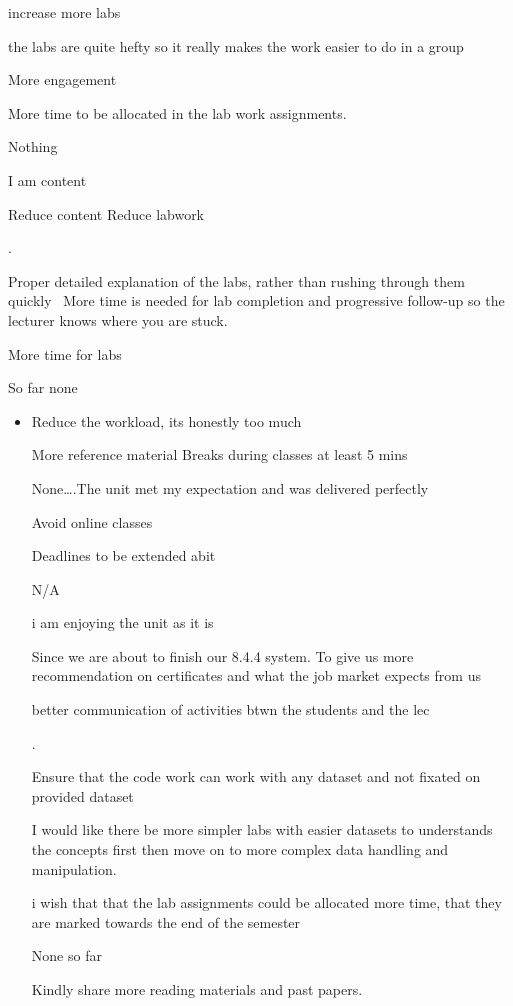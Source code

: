 \documentclass[
]{article}
\begin{document}
\begin{enumerate}
\begin{itemize}
    increase more labs

    the labs are quite hefty so it really makes the work easier to do in
    a group

    More engagement

    More time to be allocated in the lab work assignments.

    Nothing

    I am content

    Reduce content Reduce labwork

    .

    Proper detailed explanation of the labs, rather than rushing through
    them quickly~ More time is needed for lab completion and progressive
    follow-up so the lecturer knows where you are stuck.

    More time for labs

    So far none

    \begin{itemize}
    \item
      Reduce the workload, its honestly too much

      More reference material Breaks during classes at least 5 mins ~

      None\ldots.The unit met my expectation and was delivered perfectly

      Avoid online classes

      Deadlines to be extended abit

      N/A

      i am enjoying the unit as it is

      Since we are about to finish our 8.4.4 system. To give us more
      recommendation on certificates and what the job market expects
      from us

      better communication of activities btwn the students and the lec~

      .

      Ensure that the code work can work with any dataset and not
      fixated on provided dataset

      I would like there be more simpler labs with easier datasets to
      understands the concepts first then move on to more complex data
      handling and manipulation.

      i wish that that the lab assignments could be allocated more time,
      that they are marked towards the end of the semester~ ~

      None so far

      Kindly share more reading materials and past papers.


\end{itemize}
\end{itemize}
\end{enumerate}
\end{document}
